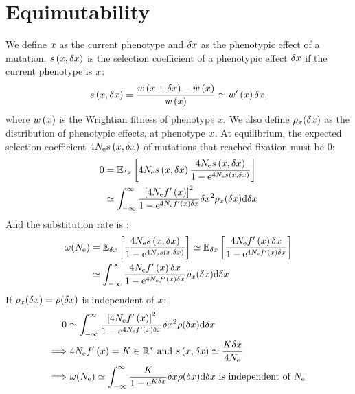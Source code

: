 \documentclass{article}
\begin{document}
\section*{Equimutability}
We define $x$ as the current phenotype and $\delta x$ as the phenotypic effect of a mutation.
$s \left( x, \delta x \right)$ is the selection coefficient of a phenotypic effect $\delta x$ if the current phenotype is $x$:
\begin{equation*}
s \left( x, \delta x \right) = \dfrac{w \left( x + \delta x \right) - w \left( x \right)}{w \left( x \right)} \simeq w'\left( x \right) \delta x, 
\end{equation*}
where $w \left( x \right)$ is the Wrightian fitness of phenotype $x$.
We also define $\rho_{x}(\delta x)$ as the distribution of phenotypic effects, at phenotype $x$.
At equilibrium, the expected selection coefficient $ 4 N_{\mathrm{e}} s \left( x, \delta x \right)$ of mutations that reached fixation must be $0$:
\begin{align*}
0 & = \operatorname{\mathbb{E}}_{\delta x} \left[ 4 N_{\mathrm{e}} s\left( x, \delta x \right) \dfrac{ 4 N_{\mathrm{e}} s\left( x, \delta x \right) }{1 - \mathrm{e}^{4N_{\mathrm{e}}s\left( x, \delta x \right)}} \right] \\ & 
\simeq \int_{-\infty}^{\infty} \dfrac{ \left[ 4 N_{\mathrm{e}} f'\left( x \right)  \right]^2}{1 - \mathrm{e}^{4N_{\mathrm{e}} f'\left( x \right) \delta x} }  \delta x^2  \rho_{x}(\delta x) \mathrm{d} \delta x 
\end{align*}
And the substitution rate is :
\begin{align*}
\omega(N_{\mathrm{e}}) & = \operatorname{\mathbb{E}}_{\delta x} \left[ \dfrac{ 4 N_{\mathrm{e}} s \left( x, \delta x \right)}{1 - \mathrm{e}^{4N_{\mathrm{e}} s \left( x, \delta x \right)}} \right] \simeq \operatorname{\mathbb{E}}_{\delta x} \left[ \dfrac{ 4 N_{\mathrm{e}} f'\left( x \right) \delta x}{1 - \mathrm{e}^{4N_{\mathrm{e}} f'\left( x \right) \delta x}} \right] \\
& \simeq \int_{-\infty}^{\infty} \dfrac{4 N_{\mathrm{e}} f'\left( x \right) \delta x}{1 - \mathrm{e}^{4N_{\mathrm{e}} f'\left( x \right) \delta x } } \rho_{x}(\delta x) \mathrm{d} \delta x \\
\end{align*}
If $\rho_{x}(\delta x) = \rho(\delta x)$ is independent of $x$:
\begin{align*}
0 & \simeq \int_{-\infty}^{\infty} \dfrac{ \left[ 4 N_{\mathrm{e}} f'\left( x \right)  \right]^2}{1 - \mathrm{e}^{4N_{\mathrm{e}} f'\left( x \right) \delta x} } \delta x^2 \rho(\delta x)  \mathrm{d} \delta x \\
\Longrightarrow & \ 4 N_{\mathrm{e}} f'\left( x \right) = K \in \mathbb{R}^{*} \text{ and } s\left( x, \delta x \right) \simeq \dfrac{K \delta x}{4N_{\mathrm{e}}} \\
\Longrightarrow & \ \omega( N_{\mathrm{e}} ) \simeq \int_{-\infty}^{\infty} \dfrac{ K  }{1 - \mathrm{e}^{K \delta x } } \delta x \rho(\delta x)  \mathrm{d} \delta x  \text{ is independent of } N_{\mathrm{e}}
\end{align*}
\end{document}

